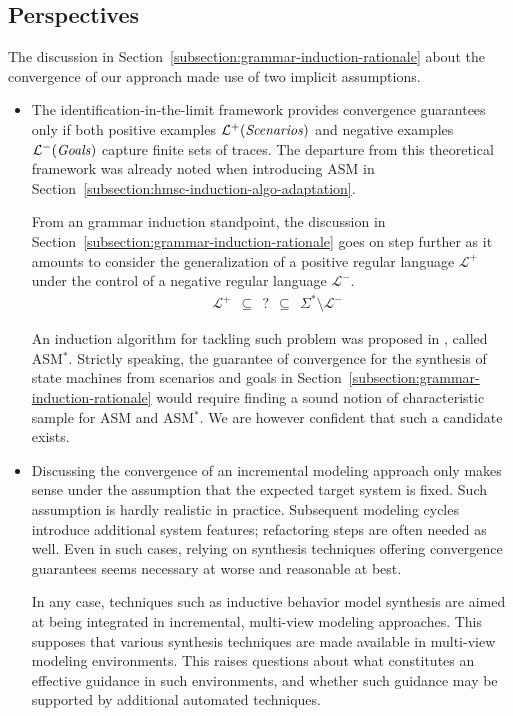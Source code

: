 \subsection{Perspectives}

The discussion in Section~\ref{subsection:grammar-induction-rationale} about the convergence of our approach made use of two implicit assumptions.
\begin{itemize}
\item The identification-in-the-limit framework provides convergence guarantees only if both positive examples $\mathcal{L}^+(\mbox{\emph{Scenarios}})$ and negative examples $\mathcal{L}^-(\mbox{\emph{Goals}})$ capture finite sets of traces. The departure from this theoretical framework was already noted when introducing ASM in Section~\ref{subsection:hmsc-induction-algo-adaptation}.

From an grammar induction standpoint, the discussion in Section~\ref{subsection:grammar-induction-rationale} goes on step further as it amounts to consider the generalization of a positive regular language $\mathcal{L}^+$ under the control of a negative regular language $\mathcal{L}^-$.
\begin{align*}
&\mathcal{L}^+~~\subseteq~~?~~\subseteq~~\Sigma^* \setminus \mathcal{L}^-
\end{align*}

An induction algorithm for tackling such problem was proposed in \cite{Lambeau:2008}, called ASM$^*$. Strictly speaking, the guarantee of convergence for the synthesis of state machines from scenarios and goals in Section~\ref{subsection:grammar-induction-rationale} would require finding a sound notion of characteristic sample for ASM and ASM$^*$. We are however confident that such a candidate exists.

\item Discussing the convergence of an incremental modeling approach only makes sense under the assumption that the expected target system is fixed. Such assumption is hardly realistic in practice. Subsequent modeling cycles introduce additional system features; refactoring steps are often needed as well. Even in such cases, relying on synthesis techniques offering convergence guarantees seems necessary at worse and reasonable at best.

In any case, techniques such as inductive behavior model synthesis are aimed at being integrated in incremental, multi-view modeling approaches. This supposes that various synthesis techniques are made available in multi-view modeling environments. This raises questions about what constitutes an effective guidance in such environments, and whether such guidance may be supported by additional automated techniques.


\end{itemize}
